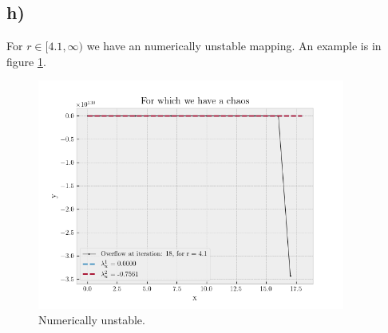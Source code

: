 \documentclass[10pt, a4paper]{amsart}
\begin{document}
\subsection{h)}
For $r\in[4.1,\infty)$ we have an numerically unstable mapping.
An example is in figure \ref{fig:6}.
\begin{figure}
	\centering
	\includegraphics[width=0.9\textwidth]{../code/g.png}

	\caption{Numerically unstable.}
		\label{fig:6}
\end{figure}
\end{document}
